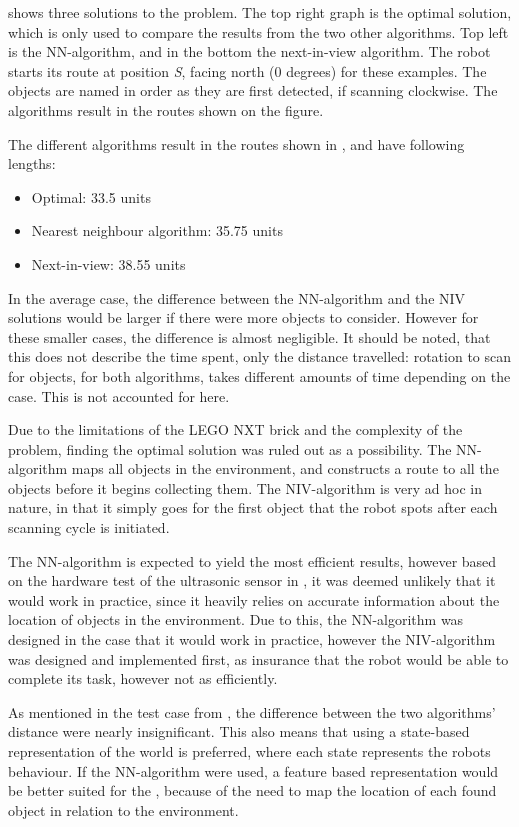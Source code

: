  shows three solutions to the problem. The top right graph is the optimal solution, which is only used to compare the results from the two other algorithms. Top left is the NN-algorithm, and in the bottom the next-in-view algorithm. The robot starts its route at position \emph{S}, facing north (0 degrees) for these examples. The objects are named in order as they are first detected, if scanning clockwise. The algorithms result in the routes shown on the figure.

The different algorithms result in the routes shown in , and have following lengths:
\begin{itemize}
\item Optimal: 33.5 units
\item Nearest neighbour algorithm: 35.75 units
\item Next-in-view: 38.55 units
\end{itemize}

In the average case, the difference between the NN-algorithm and the NIV solutions would be larger if there were more objects to consider. However for these smaller cases, the difference is almost negligible. It should be noted, that this does not describe the time spent, only the distance travelled: rotation to scan for objects, for both algorithms, takes different amounts of time depending on the case. This is not accounted for here.

Due to the limitations of the LEGO NXT brick and the complexity of the problem, finding the optimal solution was ruled out as a possibility. The NN-algorithm maps all objects in the environment, and constructs a route to all the objects before it begins collecting them. The NIV-algorithm is very ad hoc in nature, in that it simply goes for the first object that the robot spots after each scanning cycle is initiated. 

The NN-algorithm is expected to yield the most efficient results, however based on the hardware test of the ultrasonic sensor in , it was deemed unlikely that it would work in practice, since it heavily relies on accurate information about the location of objects in the environment. Due to this, the NN-algorithm was designed in the case that it would work in practice, however the NIV-algorithm was designed and implemented first, as insurance that the robot would be able to complete its task, however not as efficiently.

As mentioned in the test case from , the difference between the two algorithms' distance were nearly insignificant. This also means that using a state-based representation of the world is preferred, where each state represents the robots behaviour. If the NN-algorithm were used, a feature based representation would be better suited for the \projname{}, because of the need to map the location of each found object in relation to the environment.

